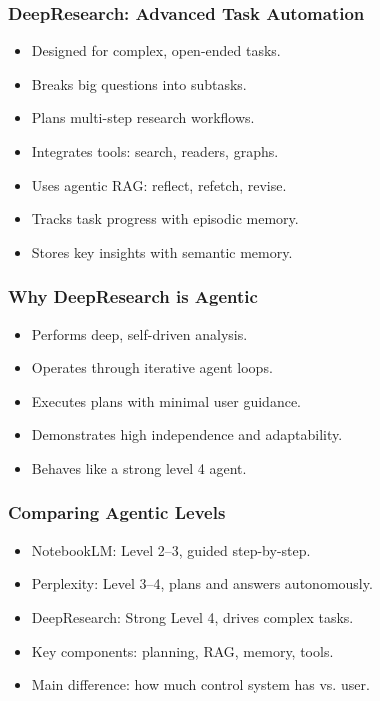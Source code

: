 \begin{frame}[fragile]\frametitle{DeepResearch: Advanced Task Automation}
    \begin{itemize}
        \item Designed for complex, open-ended tasks.
        \item Breaks big questions into subtasks.
        \item Plans multi-step research workflows.
        \item Integrates tools: search, readers, graphs.
        \item Uses agentic RAG: reflect, refetch, revise.
        \item Tracks task progress with episodic memory.
        \item Stores key insights with semantic memory.
    \end{itemize}
\end{frame}

\begin{frame}[fragile]\frametitle{Why DeepResearch is Agentic}
    \begin{itemize}
        \item Performs deep, self-driven analysis.
        \item Operates through iterative agent loops.
        \item Executes plans with minimal user guidance.
        \item Demonstrates high independence and adaptability.
        \item Behaves like a strong level 4 agent.
    \end{itemize}
\end{frame}

\begin{frame}[fragile]\frametitle{Comparing Agentic Levels}
    \begin{itemize}
        \item NotebookLM: Level 2–3, guided step-by-step.
        \item Perplexity: Level 3–4, plans and answers autonomously.
        \item DeepResearch: Strong Level 4, drives complex tasks.
        \item Key components: planning, RAG, memory, tools.
        \item Main difference: how much control system has vs. user.
    \end{itemize}
\end{frame}

